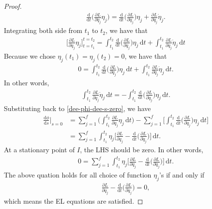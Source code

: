 \documentclass[10pt]{article}
\newcommand{\dee}{\mathrm{d}}
\begin{document}
\begin{itemize}
\begin{proof}
  		\begin{align*}
  			\frac{\dee}{\dee t} \bigg( \frac{\partial L}{\partial \dot{q}_j} \eta_j \bigg)
  			= \frac{\dee}{\dee t} \bigg( \frac{\partial L}{\partial \dot{q}_j} \bigg) \eta_j + \frac{\partial L}{\partial \dot{q}_j} \dot{\eta}_j.
  		\end{align*}
  		Integrating both side from $t_1$ to $t_2$, we have that
  		\begin{align*}	
  		\bigg[ \frac{\partial L}{\partial \dot{q}_j} \eta_j \bigg]_{t = t_1}^{t=t_2}
  		= \int_{t_1}^{t_2}  \frac{\dee}{\dee t} \bigg( \frac{\partial L}{\partial \dot{q}_j} \bigg) \eta_j\, \dee t
  		+ \int_{t_1}^{t_2} \frac{\partial L}{\partial \dot{q}_j} \dot{\eta}_j\, \dee t
  		\end{align*}
  		Because we chose $\eta_j(t_1) = \eta_j(t_2) = 0$, we have that
  		\begin{align*}
  		0
  		= \int_{t_1}^{t_2}  \frac{\dee}{\dee t} \bigg( \frac{\partial L}{\partial \dot{q}_j} \bigg) \eta_j\, \dee t
  		+ \int_{t_1}^{t_2} \frac{\partial L}{\partial \dot{q}_j} \dot{\eta}_j\, \dee t.
  		\end{align*}
  		In other words,
  		\begin{align*}
  		\int_{t_1}^{t_2} \frac{\partial L}{\partial \dot{q}_j} \dot{\eta}_j\, \dee t 
  		= - \int_{t_1}^{t_2}  \frac{\dee}{\dee t} \bigg( \frac{\partial L}{\partial \dot{q}_j} \bigg) \eta_j\, \dee t.
  		\end{align*}
  		Substituting back to \eqref{dee-phi-dee-s-zero}, we have
  		\begin{align*}
  		\frac{\dee \phi}{\dee s}\bigg|_{s=0}
  		&= \sum_{j=1}^f \bigg( \int_{t_1}^{t_2} \frac{\partial L}{\partial q_j} \eta_j\, \dee t \bigg)
  		- \sum_{j=1}^f  \bigg[ \int_{t_1}^{t_2}  \frac{\dee}{\dee t} \bigg( \frac{\partial L}{\partial \dot{q}_j} \bigg) \eta_j\, \dee t \bigg] \\
  		&= \sum_{j=1}^f \int_{t_1}^{t_2} \eta_j \bigg[ \frac{\partial L}{\partial q_j} - \frac{\dee}{\dee t} \bigg( \frac{\partial L}{\partial \dot{q}_j} \bigg) \bigg]\, \dee t.
  		\end{align*}
  		At a stationary point of $I$, the LHS should be zero. In other words,
  		\begin{align*}
  		0 = \sum_{j=1}^f \int_{t_1}^{t_2} \eta_j \bigg[ \frac{\partial L}{\partial q_j} - \frac{\dee}{\dee t} \bigg( \frac{\partial L}{\partial \dot{q}_j} \bigg) \bigg]\, \dee t.
  		\end{align*}
  		The above quation holds for all choice of function $\eta_j$'s if and only if
  		\begin{align*}
  			\frac{\partial L}{\partial q_j} - \frac{\dee}{\dee t} \bigg( \frac{\partial L}{\partial \dot{q}_j} \bigg) = 0,
  		\end{align*}
  		which means the EL equations are satisfied. 


\end{proof}
\end{itemize}
\end{document}
